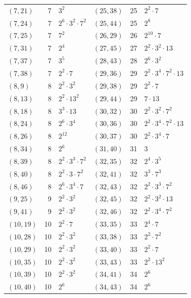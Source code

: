 \documentclass[11pt]{article}
\begin{document}
\begin{longtable}{@{}lrl@{\qquad}lrl@{}}
$(7,21)$ & 7 & $3^{2}$ & $(25,38)$ & 25 & $2^{2}\cdot 7$\\
$(7,24)$ & 7 & $2^{6}\cdot 3^{2}\cdot 7^{2}$ & $(25,44)$ & 25 & $2^{8}$\\
$(7,25)$ & 7 & $7^{2}$ & $(26,29)$ & 26 & $2^{10}\cdot 7$\\
$(7,31)$ & 7 & $2^{4}$ & $(27,45)$ & 27 & $2^{2}\cdot 3^{2}\cdot 13$\\
$(7,37)$ & 7 & $3^{5}$ & $(28,43)$ & 28 & $2^{6}\cdot 3^{2}$\\
$(7,38)$ & 7 & $2^{2}\cdot 7$ & $(29,36)$ & 29 & $2^{2}\cdot 3^{4}\cdot 7^{2}\cdot 13$\\
$(8,9)$ & 8 & $2^{2}\cdot 3^{2}$ & $(29,38)$ & 29 & $2^{2}\cdot 7$\\
$(8,13)$ & 8 & $2^{2}\cdot 13^{2}$ & $(29,44)$ & 29 & $7\cdot 13$\\
$(8,18)$ & 8 & $3^{3}\cdot 13$ & $(30,32)$ & 30 & $2^{2}\cdot 3^{2}\cdot 7^{2}$\\
$(8,24)$ & 8 & $2^{6}\cdot 3^{4}$ & $(30,36)$ & 30 & $2^{2}\cdot 3^{4}\cdot 7^{2}\cdot 13$\\
$(8,26)$ & 8 & $2^{12}$ & $(30,37)$ & 30 & $2^{2}\cdot 3^{4}\cdot 7$\\
$(8,34)$ & 8 & $2^{6}$ & $(31,40)$ & 31 & $3$\\
$(8,39)$ & 8 & $2^{2}\cdot 3^{3}\cdot 7^{2}$ & $(32,35)$ & 32 & $2^{4}\cdot 3^{5}$\\
$(8,40)$ & 8 & $2^{2}\cdot 3\cdot 7^{2}$ & $(32,41)$ & 32 & $3^{3}\cdot 7^{3}$\\
$(8,46)$ & 8 & $2^{6}\cdot 3^{4}\cdot 7$ & $(32,43)$ & 32 & $2^{2}\cdot 3^{3}\cdot 7^{2}$\\
$(9,25)$ & 9 & $2^{2}\cdot 3^{2}$ & $(32,45)$ & 32 & $2^{2}\cdot 3^{2}\cdot 13$\\
$(9,41)$ & 9 & $2^{2}\cdot 3^{2}$ & $(32,46)$ & 32 & $2^{2}\cdot 3^{4}\cdot 7^{2}$\\
$(10,19)$ & 10 & $2^{2}\cdot 7$ & $(33,35)$ & 33 & $2^{4}\cdot 7$\\
$(10,28)$ & 10 & $2^{2}\cdot 3^{2}$ & $(33,38)$ & 33 & $2^{2}\cdot 7^{2}$\\
$(10,29)$ & 10 & $2^{2}\cdot 3^{2}$ & $(33,40)$ & 33 & $2^{2}\cdot 7$\\
$(10,35)$ & 10 & $2^{2}\cdot 3^{2}$ & $(33,43)$ & 33 & $2^{2}\cdot 13^{2}$\\
$(10,39)$ & 10 & $2^{2}\cdot 3^{2}$ & $(34,41)$ & 34 & $2^{6}$\\
$(10,40)$ & 10 & $2^{6}$ & $(34,43)$ & 34 & $2^{6}$\\

\end{longtable}
\end{document}
